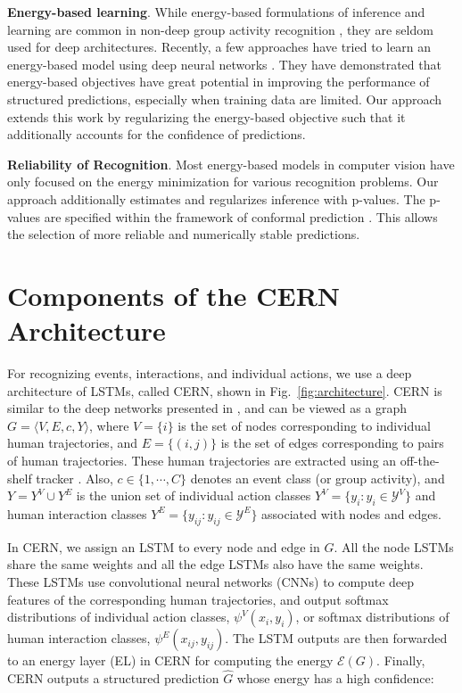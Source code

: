 \documentclass[10pt,twocolumn,letterpaper]{article}
\begin{document}
{\bf Energy-based learning}.  While energy-based formulations of inference and learning are common in non-deep group activity recognition \cite{Ramananthan2013,Amer2014,Choi2014,Shu2015}, they are seldom used for deep architectures. Recently, a few approaches have tried to learn an energy-based model \cite{LeCun2005,LeCun2006} using deep neural networks \cite{Belanger2016,Zhao2016}. They have demonstrated that energy-based objectives have great potential in improving the performance of structured predictions, especially when training data are limited. Our approach extends this work by regularizing the energy-based objective such that it additionally accounts for the confidence of predictions.


{\bf Reliability of Recognition}. Most energy-based models in computer vision have only focused on the energy minimization for various recognition problems. Our approach additionally estimates and regularizes inference with p-values. The p-values are specified within the framework of conformal prediction \cite{Shafer2008}. This allows the selection of more reliable and numerically stable predictions.






\section{Components of the CERN Architecture}\label{sec:CERNformulation}

For recognizing events, interactions, and individual actions, we use a deep architecture of LSTMs, called CERN, shown in Fig.~\ref{fig:architecture}. CERN is similar to the deep networks presented in \cite{Ibrahim2016,Jain2016}, and can be viewed as a graph $G = \langle V, E, c, Y\rangle$, where $V = \{i\}$ is the set of nodes corresponding to individual human trajectories, and $E = \{(i,j)\}$ is the set of edges corresponding to pairs of human trajectories. These human trajectories are extracted using an off-the-shelf tracker \cite{Danelljan2014}. Also, $c \in\{1,\cdots,C\}$ denotes an event class (or group activity), and $Y = Y^V \cup Y^E$ is the union set of individual action classes $Y^V=\{y_i:y_i \in \mathcal{Y}^V\}$ and human interaction classes $Y^E = \{y_{ij}:y_{ij} \in \mathcal{Y}^E\}$ associated with nodes and edges. %

In CERN, we assign an LSTM to every node and edge in $G$. All the node LSTMs share the same weights and all the edge LSTMs also have the same weights. These LSTMs use convolutional neural networks (CNNs) to compute deep features of the corresponding human trajectories, and output softmax distributions of individual action classes, $\psi^V(x_i, y_i)$, or softmax distributions of human interaction classes, $\psi^E(x_{ij}, y_{ij})$. The LSTM outputs are then forwarded to an energy layer (EL) in CERN for computing the energy $\mathcal{E}(G)$. Finally, CERN outputs a structured prediction $\hat{G}$ whose energy has a high confidence:
\end{document}
